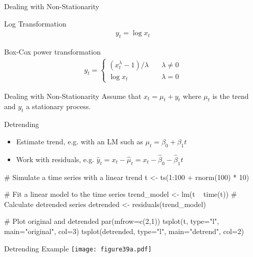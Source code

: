 \documentclass[ignorenonframetext,xcolor=x11names]{beamer}
\begin{document}
\begin{frame}{Dealing with Non-Stationarity}
\begin{block}{Log Transformation}
  \begin{align*}y_t = \log x_t\end{align*}
\end{block}
\begin{block}{Box-Cox power transformation}
  \begin{align*}y_t = \begin{cases}(x_t^\lambda-1)/\lambda &\quad \lambda\neq0 \\
  \log x_t &\quad \lambda=0
  \end{cases}
  \end{align*}
\end{block}
\end{frame}


\begin{frame}[fragile]{Dealing with Non-Stationarity}
Assume that $x_t = \mu_t + y_t$ where $\mu_t$ is the trend and $y_t$ a stationary process.
\begin{block}{Detrending}
\begin{itemize}
  \item Estimate trend, e.g. with an LM such as $\mu_t = \beta_0 + \beta_1 t$
  \item Work with residuals, e.g. $\hat y_t = x_t - \hat \mu_t = x_t - \hat\beta_0 - \hat\beta_1 t$
\end{itemize}
\end{block}
\begin{Rcode}
# Simulate a time series with a linear trend
t <- ts(1:100 + rnorm(100) * 10)

# Fit a linear model to the time series
trend_model <- lm(t ~ time(t))
# Calculate detrended series
detrended <- residuals(trend_model)

# Plot original and detrended
par(mfrow=c(2,1))
tsplot(t, type="l", main="original", col=3)
tsplot(detrended, type="l", main="detrend", col=2)
\end{Rcode}
\end{frame}

\begin{frame}{Detrending Example}
\centering
\texttt{[image: figure39a.pdf]}
\end{frame}


\end{document}
